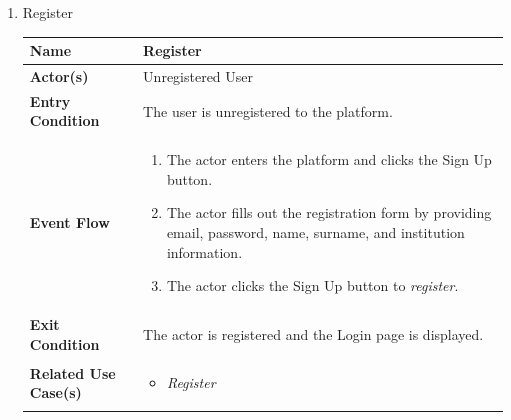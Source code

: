 \begin{enumerate}
    \item Register
    \begin{center}
        \begin{tabular}{ | m{10em} | m{10cm}| } 
          \hline
          \textbf{Name} & Register  \\ 
          \hline
         \textbf{Actor(s)} & Unregistered User \\ 
          \hline
          \textbf{Entry Condition} & The user is unregistered to the platform. \\ 
          \hline
          \textbf{Event Flow} & 
          \begin{enumerate}[(1)]
              \item The actor enters the platform and clicks the Sign Up button.
              \item The actor fills out the registration form by providing email, password, name, surname, and institution information.
              \item The actor clicks the Sign Up button to \textit{register}.
          \end{enumerate} \\
          \hline
          \textbf{Exit Condition} & The actor is registered and the Login page is displayed.  \\ 
          \hline
          \textbf{Related Use Case(s)} & 
            \begin{itemize}
                \item \textit{Register}
            \end{itemize}  \\ 
          \hline
        \end{tabular}
    \end{center}

    \newpage
    

\end{enumerate}
